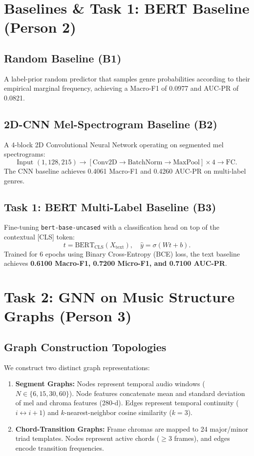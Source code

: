 \documentclass{article}
\begin{document}
\section{Baselines \& Task 1: BERT Baseline (Person 2)}
\subsection{Random Baseline (B1)}
A label-prior random predictor that samples genre probabilities according to their empirical marginal frequency, achieving a Macro-F1 of 0.0977 and AUC-PR of 0.0821.

\subsection{2D-CNN Mel-Spectrogram Baseline (B2)}
A 4-block 2D Convolutional Neural Network operating on segmented mel spectrograms:
$$\text{Input } (1, 128, 215) \to [\text{Conv2D} \to \text{BatchNorm} \to \text{MaxPool}] \times 4 \to \text{FC}.$$
The CNN baseline achieves 0.4061 Macro-F1 and 0.4260 AUC-PR on multi-label genres.

\subsection{Task 1: BERT Multi-Label Baseline (B3)}
Fine-tuning \texttt{bert-base-uncased} with a classification head on top of the contextual [CLS] token:
$$t = \text{BERT}_{\text{CLS}}(X_{\text{text}}), \quad \hat{y} = \sigma(W t + b).$$
Trained for 6 epochs using Binary Cross-Entropy (BCE) loss, the text baseline achieves \textbf{0.6100 Macro-F1, 0.7200 Micro-F1, and 0.7100 AUC-PR}.

\section{Task 2: GNN on Music Structure Graphs (Person 3)}
\subsection{Graph Construction Topologies}
We construct two distinct graph representations:
\begin{enumerate}
    \item \textbf{Segment Graphs:} Nodes represent temporal audio windows ($N \in \{6, 15, 30, 60\}$). Node features concatenate mean and standard deviation of mel and chroma features (280-d). Edges represent temporal continuity ($i \leftrightarrow i+1$) and $k$-nearest-neighbor cosine similarity ($k=3$).
    \item \textbf{Chord-Transition Graphs:} Frame chromas are mapped to 24 major/minor triad templates. Nodes represent active chords ($\ge 3$ frames), and edges encode transition frequencies.
\end{enumerate}
\end{document}
